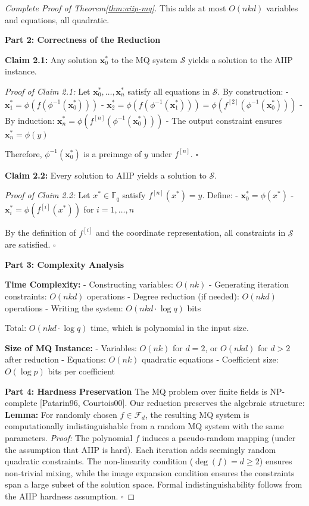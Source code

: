 \begin{proof}[Complete Proof of Theorem\ref{thm:aiip-mq}]
        This adds at most $O(nkd)$ variables and equations, all quadratic.

    \textbf{Part 2: Correctness of the Reduction}

        \textbf{Claim 2.1:} Any solution $\mathbf{x}_0^*$ to the MQ system $\mathcal{S}$ yields a 
        solution to the AIIP instance.

        \textit{Proof of Claim 2.1:} 
        Let $\mathbf{x}_0^*, \ldots, \mathbf{x}_n^*$ satisfy all equations in $\mathcal{S}$. 
        By construction:
        - $\mathbf{x}_1^* = \phi(f(\phi^{-1}(\mathbf{x}_0^*)))$
        - $\mathbf{x}_2^* = \phi(f(\phi^{-1}(\mathbf{x}_1^*))) = \phi(f^{[2]}(\phi^{-1}(\mathbf{x}_0^*)))$
        - By induction: $\mathbf{x}_n^* = \phi(f^{[n]}(\phi^{-1}(\mathbf{x}_0^*)))$
        - The output constraint ensures $\mathbf{x}_n^* = \phi(y)$

        Therefore, $\phi^{-1}(\mathbf{x}_0^*)$ is a preimage of $y$ under $f^{[n]}$. $\square$

        \textbf{Claim 2.2:} Every solution to AIIP yields a solution to $\mathcal{S}$.

        \textit{Proof of Claim 2.2:}
        Let $x^* \in \mathbb{F}_q$ satisfy $f^{[n]}(x^*) = y$. Define:
        - $\mathbf{x}_0^* = \phi(x^*)$
        - $\mathbf{x}_i^* = \phi(f^{[i]}(x^*))$ for $i = 1, \ldots, n$

        By the definition of $f^{[i]}$ and the coordinate representation, all constraints in 
        $\mathcal{S}$ are satisfied. $\square$

    \textbf{Part 3: Complexity Analysis}

        \textbf{Time Complexity:}
        - Constructing variables: $O(nk)$
        - Generating iteration constraints: $O(nkd)$ operations
        - Degree reduction (if needed): $O(nkd)$ operations
        - Writing the system: $O(nkd \cdot \log q)$ bits

        Total: $O(nkd \cdot \log q)$ time, which is polynomial in the input size.

        \textbf{Size of MQ Instance:}
        - Variables: $O(nk)$ for $d = 2$, or $O(nkd)$ for $d > 2$ after reduction
        - Equations: $O(nk)$ quadratic equations
        - Coefficient size: $O(\log p)$ bits per coefficient

    \textbf{Part 4: Hardness Preservation}
        The MQ problem over finite fields is NP-complete [Patarin96, Courtois00]. Our reduction  preserves the algebraic structure:
        \textbf{Lemma:} For randomly chosen $f \in \mathcal{F}_d$, the resulting MQ system is computationally indistinguishable from a random MQ system with the same parameters.
        \textit{Proof:} The polynomial $f$ induces a pseudo-random mapping (under the assumption that AIIP is hard). Each iteration adds seemingly random quadratic constraints. The 
        non-linearity condition ($\deg(f) = d \geq 2$) ensures non-trivial mixing, while the     image expansion condition ensures the constraints span a large subset of the solution 
        space. Formal indistinguishability follows from the AIIP hardness assumption. $\square$


\end{proof}
